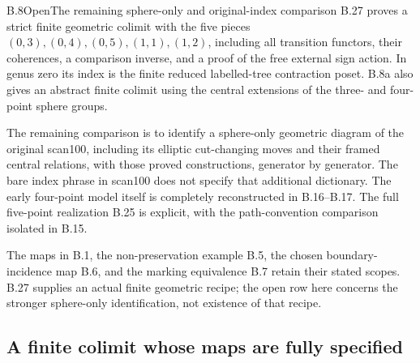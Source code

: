 \begin{result}{B.8}{Open}{The remaining sphere-only and original-index comparison}
B.27 proves a strict finite geometric colimit with the five
pieces $(0,3),(0,4),(0,5),(1,1),(1,2)$, including all
transition functors, their coherences, a comparison inverse,
and a proof of the free external sign action.  In genus zero
its index is the finite reduced labelled-tree contraction poset.
B.8a also gives an abstract finite colimit using the central
extensions of the three- and four-point sphere groups.

The remaining comparison is to identify a sphere-only geometric
diagram of the original scan100, including its elliptic cut-changing
moves and their framed central relations, with those proved
constructions, generator by generator.  The bare index phrase
in scan100 does not specify that additional dictionary.
The early four-point model itself is completely reconstructed
in B.16--B.17.  The full five-point realization B.25 is explicit,
with the path-convention comparison isolated in B.15.
\end{result}
The maps in B.1, the non-preservation example B.5, the chosen
boundary-incidence map B.6, and the marking equivalence B.7
retain their stated scopes.  B.27 supplies an actual finite
geometric recipe; the open row here concerns the stronger
sphere-only identification, not existence of that recipe.

\subsection{A finite colimit whose maps are fully specified}

